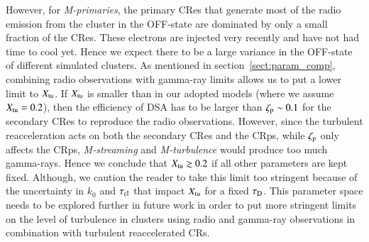\documentclass[fleqn,usenatbib,useAMS]{mnras}
\newcommand{\Mstream}{{\it M-streaming}\xspace}
\newcommand{\Mflatturb}{{\it M-turbulence}\xspace}
\newcommand{\Mprimary}{{\it M-primaries}\xspace}
\begin{document}
However, for \Mprimary, the primary CRes that generate most of the
radio emission from the cluster in the OFF-state are dominated by only
a small fraction of the CRes. These electrons are injected very
recently and have not had time to cool yet. Hence we expect there to
be a large variance in the OFF-state of different simulated
clusters. As mentioned in section~\ref{sect:param_comp}, combining
radio observations with gamma-ray limits allows us to put a lower
limit to $X_{\mathrm{tu}}$.  If $X_{\mathrm{tu}}$ is smaller than in our adopted
models (where we assume $X_{\mathrm{tu}}=0.2$), then the efficiency of DSA
has to be larger than $\zeta_{\mathrm{p}}\sim 0.1$ for the secondary CRes
to reproduce the radio observations. However, since the turbulent
reacceleration acts on both the secondary CRes and the CRps, while
$\zeta_{\mathrm{p}}$ only affects the CRps, \Mstream and \Mflatturb would
produce too much gamma-rays. Hence we conclude that
$X_{\mathrm{tu}}\gtrsim0.2$ if all other parameters are kept
fixed. Although, we caution the reader to take this limit too
stringent because of the uncertainty in $k_0$ and $\tau_{\mathrm{cl}}$ that
impact $X_{\mathrm{tu}}$ for a fixed $\tau_{\mathrm{D}}$. This parameter space
needs to be explored further in future work in order to put more
stringent limits on the level of turbulence in clusters using radio
and gamma-ray observations in combination with turbulent reaccelerated
CRs.
\end{document}

